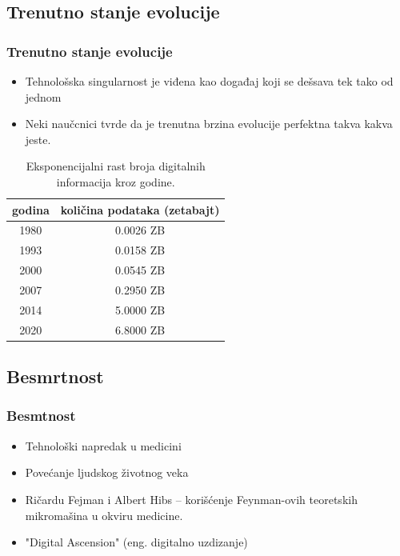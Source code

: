 \documentclass{beamer}
\begin{document}
\subsection{Trenutno stanje evolucije}
\begin{frame}[fragile]\frametitle{Trenutno stanje evolucije}
	\begin{itemize}	
		\item Tehnološska singularnost je viđena kao događaj koji se dešsava tek tako od
jednom
            \item Neki naučcnici tvrde da je trenutna brzina evolucije perfektna takva kakva
jeste.
	\end{itemize}
 
        \begin{table}[h!]
            \begin{center}
                \begin{tabular}{|c|c|} \hline
                    \textbf{godina}& \textbf{količina podataka (zetabajt)}\\ \hline
                        1980 &0.0026 ZB\\ \hline
                        1993 &0.0158 ZB\\ \hline
                        2000 &0.0545 ZB\\ \hline
                        2007 &0.2950 ZB\\ \hline
                        2014 &5.0000 ZB\\ \hline
                        2020 &6.8000 ZB\\ \hline
                \end{tabular}
            \caption{Eksponencijalni rast broja digitalnih informacija kroz godine.}
            \label{tab:tabela1}
            \end{center}
        \end{table}
\end{frame}
\subsection{Besmrtnost}
\begin{frame}[fragile]\frametitle{Besmtnost}
	\begin{itemize}	
        \item Tehnološki napredak u medicini
        \item Povećanje ljudskog životnog veka
        \item Ričardu Fejman i Albert Hibs – korišćenje Feynman-ovih teoretskih mikromašina u okviru medicine.
        \item "Digital Ascension" (eng. digitalno uzdizanje)
	\end{itemize}
\end{frame}
\end{document}
